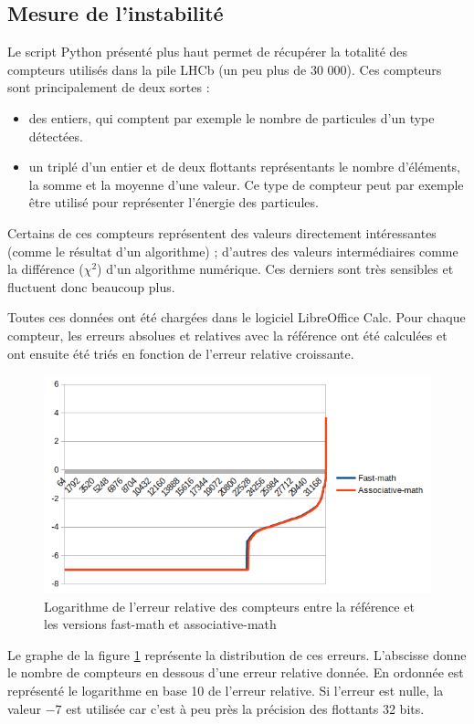 \documentclass[a4paper,11pt]{report}
\begin{document}
\subsection{Mesure de l'instabilité}
Le script Python présenté plus haut permet de récupérer la totalité des compteurs utilisés dans la pile LHCb (un peu plus de 30 000).
Ces compteurs sont principalement de deux sortes :
\begin{itemize}
    \item des entiers, qui comptent par exemple le nombre de particules d'un type détectées.
    \item un triplé d'un entier et de deux flottants représentants le nombre d'éléments, la somme et la moyenne d'une valeur.
          Ce type de compteur peut par exemple être utilisé pour représenter l'énergie des particules.
\end{itemize}
Certains de ces compteurs représentent des valeurs directement intéressantes (comme le résultat d'un algorithme) ;
d'autres des valeurs intermédiaires comme la différence ($\chi^2$) d'un algorithme numérique.
Ces derniers sont très sensibles et fluctuent donc beaucoup plus.

Toutes ces données ont été chargées dans le logiciel LibreOffice Calc.
Pour chaque compteur, les erreurs absolues et relatives avec la référence ont été calculées et ont ensuite été triés en fonction de l'erreur relative croissante.

\begin{figure}[H]
    \includegraphics[width=\textwidth, center]{fast-math_difference.png}
    \caption{Logarithme de l'erreur relative des compteurs entre la référence et les versions fast-math et associative-math}
    \label{fast-math_difference}
\end{figure}

Le graphe de la figure \ref{fast-math_difference} représente la distribution de ces erreurs.
L'abscisse donne le nombre de compteurs en dessous d'une erreur relative donnée.
En ordonnée est représenté le logarithme en base 10 de l'erreur relative.
Si l'erreur est nulle, la valeur $-7$ est utilisée car c'est à peu près la précision des flottants 32 bits.
\end{document}
